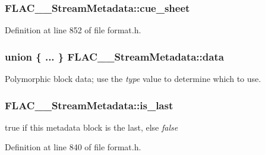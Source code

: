 \subsubsection[{\texorpdfstring{cue\+\_\+sheet}{cue_sheet}}]{ F\+L\+A\+C\+\_\+\+\_\+\+Stream\+Metadata\+::cue\+\_\+sheet}\hypertarget{struct_f_l_a_c_____stream_metadata_a68e7d388eeb7e35076e016370a74e0ec}{}\label{struct_f_l_a_c_____stream_metadata_a68e7d388eeb7e35076e016370a74e0ec}


Definition at line 852 of file format.\+h.

\subsubsection[{\texorpdfstring{data}{data}}]{\setlength{\rightskip}{0pt plus 5cm}union \{ ... \}   F\+L\+A\+C\+\_\+\+\_\+\+Stream\+Metadata\+::data}\hypertarget{struct_f_l_a_c_____stream_metadata_a1029e424f4f3814c4465384366afd3f2}{}\label{struct_f_l_a_c_____stream_metadata_a1029e424f4f3814c4465384366afd3f2}
Polymorphic block data; use the {\itshape type} value to determine which to use. 
\subsubsection[{\texorpdfstring{is\+\_\+last}{is_last}}]{ F\+L\+A\+C\+\_\+\+\_\+\+Stream\+Metadata\+::is\+\_\+last}\hypertarget{struct_f_l_a_c_____stream_metadata_aef40bbf85abe12e035f66f2d54ed316c}{}\label{struct_f_l_a_c_____stream_metadata_aef40bbf85abe12e035f66f2d54ed316c}
{\ttfamily true} if this metadata block is the last, else {\itshape false} 

Definition at line 840 of file format.\+h.

